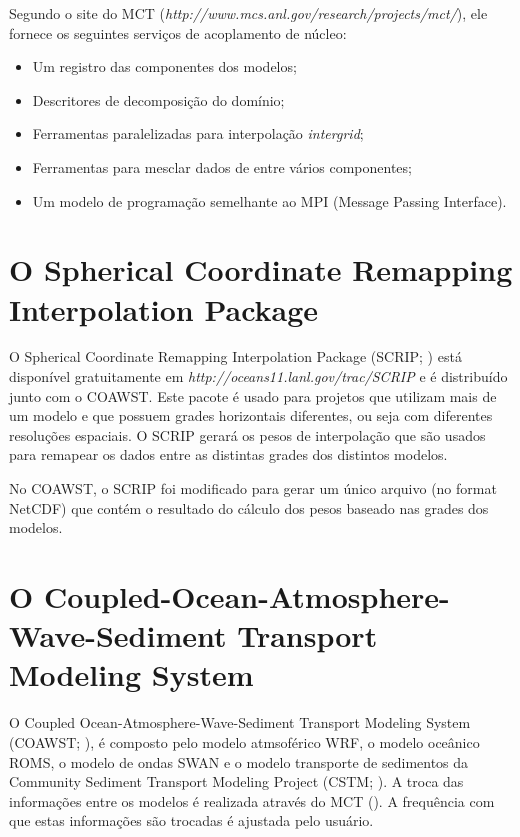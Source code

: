 \noindent Segundo o site do MCT (\textcolor{bleu_cite}{\textit{http://www.mcs.anl.gov/research/projects/mct/}}), ele fornece os seguintes serviços de acoplamento de núcleo:
\bigskip

\begin{itemize}
\item Um registro das componentes dos modelos;
\item Descritores de decomposição do domínio;
\item Ferramentas paralelizadas para interpolação \textit{intergrid};
\item Ferramentas para mesclar dados de entre vários componentes;
\item Um modelo de programação semelhante ao MPI (Message Passing Interface).
\end{itemize}
\bigskip

\section{ O Spherical Coordinate Remapping Interpolation Package}\label{scripsecao}
\bigskip

\noindent O  Spherical Coordinate Remapping Interpolation Package (SCRIP; \cite{Jones1999,Jones1998}) está disponível gratuitamente em \textcolor{bleu_cite}{\textit{http://oceans11.lanl.gov/trac/SCRIP}} e é distribuído junto com o COAWST. Este pacote é usado para projetos que utilizam mais de um modelo e que possuem grades horizontais diferentes, ou seja com diferentes resoluções espaciais. O SCRIP gerará os pesos de interpolação que são usados para remapear os dados entre as distintas grades dos distintos modelos.
\bigskip

\noindent No COAWST, o SCRIP foi modificado para gerar um único arquivo (no format NetCDF) que contém o resultado do cálculo dos pesos baseado nas grades dos modelos.

\bigskip

\section{O Coupled-Ocean-Atmosphere-Wave-Sediment Transport Modeling System}
\bigskip
\noindent O Coupled Ocean-Atmosphere-Wave-Sediment Transport Modeling System (COAWST; \cite{Warner2010,Warner2008}), é composto pelo modelo atmsoférico WRF, o modelo oceânico ROMS, o modelo de ondas SWAN e o modelo transporte de sedimentos da Community Sediment Transport Modeling Project (CSTM; \cite{Warner2008}). A troca das informações entre os modelos é realizada através do MCT (\cite{Warner2010,Warner2008}). A frequência com que estas informações são trocadas é ajustada pelo usuário.
\bigskip

